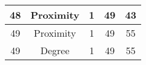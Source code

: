 \documentclass[results.tex]{subfiles}
\begin{document}
\begin{center}
\begin{tabular}{| c || c | c | c | c |}
            \hline
            48                      & Proximity                    & 1                      & 49                      & 43                   \\
            \hline
            49                      & Proximity                    & 1                      & 49                      & 55                   \\
            \hline
            49                      & Degree                       & 1                      & 49                      & 55                   \\
            \hline
        \end{tabular}
    \end{center}
\end{document}
